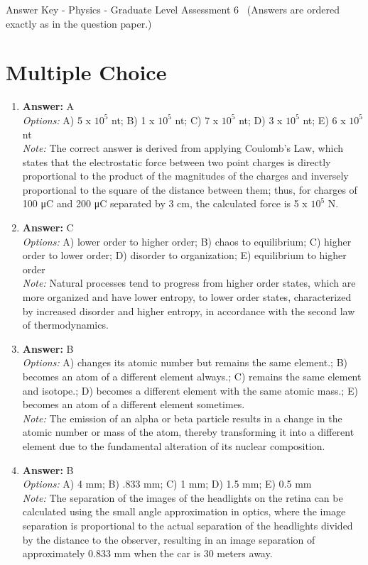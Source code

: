 \documentclass[12pt]{article}
\begin{document}
\begin{center}
Answer Key - Physics - Graduate Level Assessment 6 \
\small (Answers are ordered exactly as in the question paper.)
\end{center}

\section*{Multiple Choice}
\begin{enumerate}[label=\arabic*.]
\item \textbf{Answer:} A
\\ \textit{Options:} A) 5 x $10^5$ nt; B) 1 x $10^5$ nt; C) 7 x $10^5$ nt; D) 3 x $10^5$ nt; E) 6 x $10^5$ nt
\\ \textit{Note:} The correct answer is derived from applying Coulomb's Law, which states that the electrostatic force between two point charges is directly proportional to the product of the magnitudes of the charges and inversely proportional to the square of the distance between them; thus, for charges of 100 μC and 200 μC separated by 3 cm, the calculated force is 5 x $10^5$ N.
\item \textbf{Answer:} C
\\ \textit{Options:} A) lower order to higher order; B) chaos to equilibrium; C) higher order to lower order; D) disorder to organization; E) equilibrium to higher order
\\ \textit{Note:} Natural processes tend to progress from higher order states, which are more organized and have lower entropy, to lower order states, characterized by increased disorder and higher entropy, in accordance with the second law of thermodynamics.
\item \textbf{Answer:} B
\\ \textit{Options:} A) changes its atomic number but remains the same element.; B) becomes an atom of a different element always.; C) remains the same element and isotope.; D) becomes a different element with the same atomic mass.; E) becomes an atom of a different element sometimes.
\\ \textit{Note:} The emission of an alpha or beta particle results in a change in the atomic number or mass of the atom, thereby transforming it into a different element due to the fundamental alteration of its nuclear composition.
\item \textbf{Answer:} B
\\ \textit{Options:} A) 4 mm; B) .833 mm; C) 1 mm; D) 1.5 mm; E) 0.5 mm
\\ \textit{Note:} The separation of the images of the headlights on the retina can be calculated using the small angle approximation in optics, where the image separation is proportional to the actual separation of the headlights divided by the distance to the observer, resulting in an image separation of approximately 0.833 mm when the car is 30 meters away.

\end{enumerate}
\end{document}
